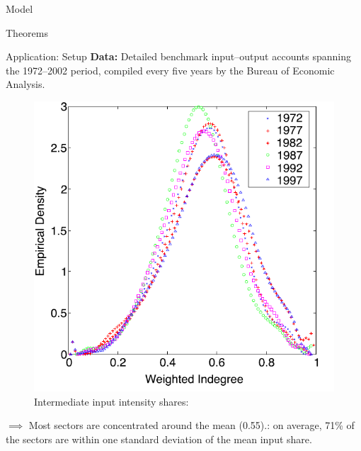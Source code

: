 \documentclass{beamer}
\begin{document}
\begin{frame}{Model}
    \justifying
  
\end{frame}

\begin{frame}{Theorems}
    \justifying
  
\end{frame}

\begin{frame}{Application: Setup}
    \justifying
  {\bf Data:} Detailed
  benchmark input–output accounts spanning the 1972–2002 period, compiled
  every five years by the Bureau of Economic Analysis.\\[5pt]
\begin{figure}[H]
    \caption*{ Intermediate input intensity shares:}
    \includegraphics[scale=0.6]{4}
    \centering
\end{figure}   

$\implies$ Most sectors are concentrated around the mean (0.55).: on average, 71\% of the sectors are within one
standard deviation of the mean input share.
\end{frame}
\end{document}

